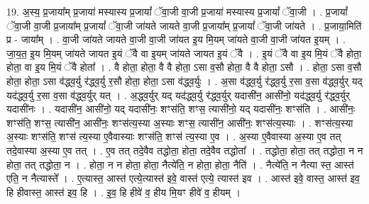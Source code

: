 \documentclass[17pt]{extarticle}
\begin{document}
19. अ॒स्य॒ प्र॒जाया᳚म् प्र॒जाया॑ मस्यास्य प्र॒जायां᳚ ॅवा॒जी वा॒जी प्र॒जाया॑ मस्यास्य प्र॒जायां᳚ ॅवा॒जी । . प्र॒जायां᳚ ॅवा॒जी वा॒जी प्र॒जाया᳚म् प्र॒जायां᳚ ॅवा॒जी जा॑यते जायते वा॒जी प्र॒जाया᳚म् प्र॒जायां᳚ ॅवा॒जी जा॑यते । . प्र॒जाया॒मिति॑ प्र - जाया᳚म् । . वा॒जी जा॑यते जायते वा॒जी वा॒जी जा॑यत इ॒य मि॒यम् जा॑यते वा॒जी वा॒जी जा॑यत इ॒यम् । . जा॒य॒त॒ इ॒य मि॒यम् जा॑यते जायत इ॒यं ॅवै वा इ॒यम् जा॑यते जायत इ॒यं ॅवै । . इ॒यं ॅवै वा इ॒य मि॒यं ॅवै होता॒ होता॒ वा इ॒य मि॒यं ॅवै होता᳚ । . वै होता॒ होता॒ वै वै होता॒ ऽसा व॒सौ होता॒ वै वै होता॒ ऽसौ । . होता॒ ऽसा व॒सौ होता॒ होता॒ ऽसा व॑द्ध्व॒र्यु र॑द्ध्व॒र्यु र॒सौ होता॒ होता॒ ऽसा व॑द्ध्व॒र्युः । . अ॒सा व॑द्ध्व॒र्यु र॑द्ध्व॒र्यु र॒सा व॒सा व॑द्ध्व॒र्युर् यद् यद॑द्ध्व॒र्यु र॒सा व॒सा व॑द्ध्व॒र्युर् यत् । . अ॒द्ध्व॒र्युर् यद् यद॑द्ध्व॒र्यु र॑द्ध्व॒र्युर् यदासी॑न॒ आसी॑नो॒ यद॑द्ध्व॒र्यु र॑द्ध्व॒र्युर् यदासी॑नः । . यदासी॑न॒ आसी॑नो॒ यद् यदासी॑नः॒ शꣳस॑ति॒ शꣳस॒ त्यासी॑नो॒ यद् यदासी॑नः॒ शꣳस॑ति । . आसी॑नः॒ शꣳस॑ति॒ शꣳस॒ त्यासी॑न॒ आसी॑नः॒ शꣳस॑त्य॒स्या अ॒स्याः शꣳस॒ त्यासी॑न॒ आसी॑नः॒ शꣳस॑त्य॒स्याः । . शꣳस॑त्य॒स्या अ॒स्याः शꣳस॑ति॒ शꣳस॑ त्य॒स्या ए॒वैवास्याः शꣳस॑ति॒ शꣳस॑ त्य॒स्या ए॒व । . अ॒स्या ए॒वैवास्या अ॒स्या ए॒व तत् तदे॒वास्या अ॒स्या ए॒व तत् । . ए॒व तत् तदे॒वैव तद्धोता॒ होता॒ तदे॒वैव तद्धोता᳚ । . तद्धोता॒ होता॒ तत् तद्धोता॒ न न होता॒ तत् तद्धोता॒ न । . होता॒ न न होता॒ होता॒ नैत्ये॑ति॒ न होता॒ होता॒ नैति॑ । . नैत्ये॑ति॒ न नैत्या स्त॒ आस्त॑ एति॒ न नैत्यास्ते᳚ । . ए॒त्यास्त॒ आस्त॑ एत्ये॒त्यास्त॑ इवे॒ वास्त॑ एत्ये॒ त्यास्त॑ इव । . आस्त॑ इवे॒ वास्त॒ आस्त॑ इव॒ हि हीवास्त॒ आस्त॑ इव॒ हि । . इ॒व॒ हि हीवे॑ व॒ हीय मि॒यꣳ हीवे॑ व॒ हीयम् । \newline
\end{document}
